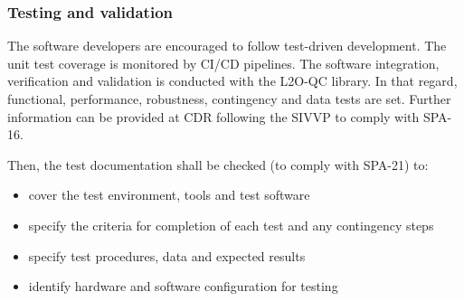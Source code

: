 \subsubsection{Testing and validation}
\label{subsec:testing-validation}

%
%
%
%
%
%
%
%
%
%
%
%
%
%

The software developers are encouraged to follow test-driven development. The unit test coverage is monitored by CI/CD pipelines. The software integration, verification and validation is conducted with the L2O-QC library. In that regard, functional, performance, robustness, contingency and data tests are set. Further information can be provided at CDR following the SIVVP to comply with SPA-16.

Then, the test documentation shall be checked (to comply with SPA-21) to:

\begin{itemize}
    \item cover the test environment, tools and test software
    \item specify the criteria for completion of each test and any contingency steps
    \item specify test procedures, data and expected results
    \item identify hardware and software configuration for testing
\end{itemize}


